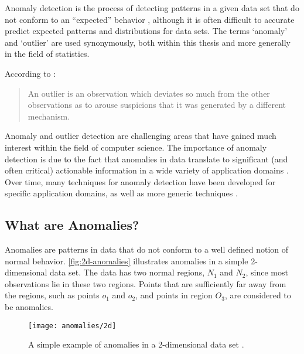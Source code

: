 Anomaly detection is the process of detecting patterns in a given data set that
do not conform to an ``expected'' behavior \cite{Chandola:2007}, although it is
often difficult to accurate predict expected patterns and distributions for data
sets. The terms `anomaly' and `outlier' are used synonymously, both within this
thesis and more generally in the field of statistics.

According to \citeauthor{Hawkins:1980} \cite{Hawkins:1980}:
\begin{quote}
An outlier is an observation which deviates so much from the other observations
as to arouse suspicions that it was generated by a different mechanism.
\end{quote}

Anomaly and outlier detection are challenging areas that have gained much
interest within the field of computer science. The importance of anomaly
detection is due to the fact that anomalies in data translate to significant
(and often critical) actionable information in a wide variety of application
domains \cite{Chandola:2007}. Over time, many techniques for anomaly detection
have been developed for specific application domains, as well as more generic
techniques \cite{Chandola:2007}.

\subsection{What are Anomalies?}
\label{anomalyDetection:whatAre}
Anomalies are patterns in data that do not conform to a well defined notion of
normal behavior. \autoref{fig:2d-anomalies} illustrates anomalies in a simple
2-dimensional data set. The data has two normal regions, $N_1$ and $N_2$, since
most observations lie in these two regions. Points that are sufficiently far
away from the regions, such as points $o_1$ and $o_2$, and points in region
$O_3$, are considered to be anomalies.

\begin{figure}
    \centering
    \texttt{[image: anomalies/2d]}
    \caption[A simple example of anomalies in a 2-dimensional data set.]
        {A simple example of anomalies in a 2-dimensional data set
        \cite{Chandola:2007}.}
    \label{fig:2d-anomalies}
\end{figure}


